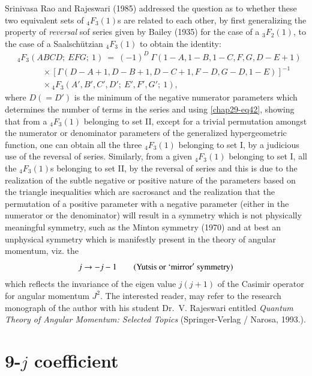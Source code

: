 Srinivasa Rao and Rajeswari (1985) addressed the question as to whether these two equivalent sets of $_4F_3(1)$s are related to each other, by first generalizing the property of \textit{reversal} sof series given by Bailey (1935) for the case of a $_3F_2(1)$, to the case of a Saalschützian $_4F_3(1)$ to obtain the identity:
\begin{equation}
\begin{split}
& {}_4F_3(ABCD;\ EFG;\ 1)\ =\ (-1)^D\ \Gamma(1-A,1-B,1-C,F,G,D-E+1)\\
& \qquad\quad\times [\Gamma(D-A+1, D-B+1, D-C+1, F-D, G-D, 1-E)]^{-1}\\
& \qquad\quad\times {}_4F_3(A',B',C',D';\ E',F',G';\ 1), \label{chap29-eq42}
\end{split}
\end{equation}
where $D(=D')$ is the minimum of the negative numerator parameters which determines the number of terms in the series and using \eqref{chap29-eq42}, showing that from a $_4F_3(1)$ belonging to set II, except for a trivial permutation amongst the numerator or denominator parameters of the generalized hypergeometric function, one can obtain all the three $_4F_3(1)$ belonging to set I, by a judicious use of the reversal of series. Similarly, from a given $_4F_3(1)$ belonging to set I, all the $_4F_3(1)$s belonging to set II, by the reversal of series and this is due to the realization of the subtle negative or positive nature of the parameters based on the triangle inequalities which are sacrosanct and the realization that the permutation of a positive parameter with a negative parameter (either in the numerator or the denominator) will result in a symmetry which is not physically meaningful symmetry, such as the Minton symmetry (1970) and at best an unphysical symmetry which is manifestly present in the theory of angular momentum, viz. the
\begin{equation} 
j\rightarrow -j-1 \qquad ({\rm Yutsis\ or\ `mirror'\ symmetry}) \label{chap29-eq43}
\end{equation}
which reflects the invariance of the eigen value $j(j+1)$ of the Casimir operator for angular momentum $J^2$. The interested reader, may refer to the research monograph of the author with his student Dr.\ V. Rajeswari entitled \textit{Quantum Theory of Angular Momentum: Selected Topics} (Springer-Verlag / Narosa, 1993.).

\section*{9-$j$ coefficient}

